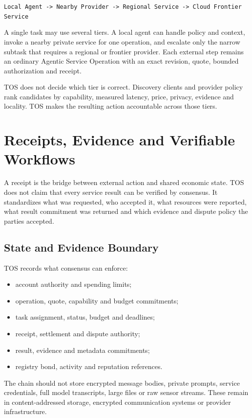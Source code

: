 \documentclass[11pt,oneside]{article}
\begin{document}
\begin{center}
\texttt{Local Agent -> Nearby Provider -> Regional Service -> Cloud Frontier Service}
\end{center}

A single task may use several tiers. A local agent can handle policy and context, invoke a
nearby private service for one operation, and escalate only the narrow subtask that requires a
regional or frontier provider. Each external step remains an ordinary Agentic Service
Operation with an exact revision, quote, bounded authorization and receipt.

TOS does not decide which tier is correct. Discovery clients and provider policy rank
candidates by capability, measured latency, price, privacy, evidence and locality. TOS makes
the resulting action accountable across those tiers.

\section{Receipts, Evidence and Verifiable Workflows}

A receipt is the bridge between external action and shared economic state. TOS does not claim
that every service result can be verified by consensus. It standardizes what was requested,
who accepted it, what resources were reported, what result commitment was returned and which
evidence and dispute policy the parties accepted.

\subsection{State and Evidence Boundary}

TOS records what consensus can enforce:

\begin{itemize}
  \item account authority and spending limits;
  \item operation, quote, capability and budget commitments;
  \item task assignment, status, budget and deadlines;
  \item receipt, settlement and dispute authority;
  \item result, evidence and metadata commitments;
  \item registry bond, activity and reputation references.
\end{itemize}

The chain should not store encrypted message bodies, private prompts, service credentials,
full model transcripts, large files or raw sensor streams. These remain in content-addressed
storage, encrypted communication systems or provider infrastructure.
\end{document}
